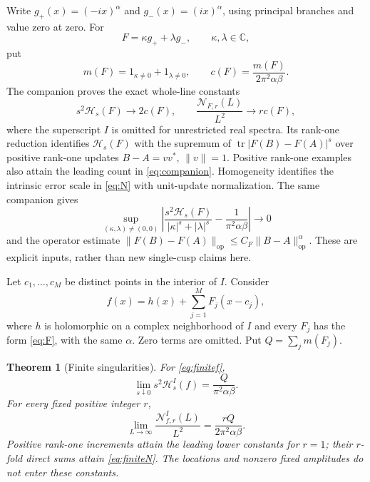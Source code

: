 \documentclass[11pt]{article}
\newtheorem{theorem}{Theorem}[section]
\numberwithin{equation}{section}
\newcommand{\tr}{\operatorname{tr}}
\newcommand{\op}{\mathrm{op}}
\newcommand{\C}{\mathbb C}
\newcommand{\cH}{\mathcal H}
\newcommand{\cN}{\mathcal N}
\begin{document}
Write $g_+(x)=(-ix)^\alpha$ and $g_-(x)=(ix)^\alpha$, using principal
branches and value zero at zero. For
\begin{equation}\label{eq:F}
 F=\kappa g_++\lambda g_-,\qquad \kappa,\lambda\in\C,
\end{equation}
put
\begin{equation}\label{eq:channelcount}
 m(F)=1_{\kappa\ne0}+1_{\lambda\ne0},\qquad
 c(F)=\frac{m(F)}{2\pi^2\alpha\beta}.
\end{equation}
The companion \cite{Channels} proves the exact whole-line constants
\begin{equation}\label{eq:companion}
 s^2\cH_s(F)\longrightarrow 2c(F),\qquad
 \frac{\cN_{F,r}(L)}{L^2}\longrightarrow r c(F),
\end{equation}
where the superscript $I$ is omitted for unrestricted real spectra.
Its rank-one reduction identifies $\cH_s(F)$ with the supremum of
$\tr|F(B)-F(A)|^s$ over positive rank-one updates
$B-A=vv^*$, $\|v\|=1$. Positive rank-one examples also attain the
leading count in \eqref{eq:companion}. Homogeneity identifies the
intrinsic error scale in \eqref{eq:N} with unit-update normalization.
The same companion gives
\begin{equation}\label{eq:uniformsingle}
 \sup_{(\kappa,\lambda)\ne(0,0)}
 \left|\frac{s^2\cH_s(F)}{|\kappa|^s+|\lambda|^s}
                  -\frac1{\pi^2\alpha\beta}\right|\longrightarrow0
\end{equation}
and the operator estimate
$\|F(B)-F(A)\|_{\op}\le C_F\|B-A\|_{\op}^{\alpha}$.
These are explicit inputs, rather than new single-cusp claims here.

Let $c_1,\ldots,c_M$ be distinct points in the interior of $I$. Consider
\begin{equation}\label{eq:finitef}
 f(x)=h(x)+\sum_{j=1}^M F_j(x-c_j),
\end{equation}
where $h$ is holomorphic on a complex neighborhood of $I$ and every
$F_j$ has the form \eqref{eq:F}, with the same $\alpha$.
Zero terms are omitted. Put $Q=\sum_j m(F_j)$.

\begin{theorem}[Finite singularities]\label{thm:finite}
For \eqref{eq:finitef},
\begin{equation}\label{eq:finiteH}
 \lim_{s\downarrow0}s^2\cH_s^I(f)
                  =\frac{Q}{\pi^2\alpha\beta}.
\end{equation}
For every fixed positive integer $r$,
\begin{equation}\label{eq:finiteN}
 \lim_{L\to\infty}\frac{\cN_{f,r}^I(L)}{L^2}
                  =\frac{rQ}{2\pi^2\alpha\beta}.
\end{equation}
Positive rank-one increments attain the leading lower constants for
$r=1$; their $r$-fold direct sums attain \eqref{eq:finiteN}.
The locations and nonzero fixed amplitudes do not enter these constants.
\end{theorem}
\end{document}
